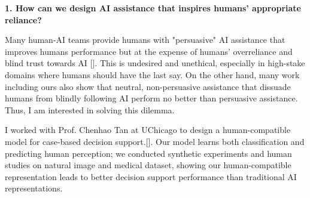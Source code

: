 
\noindent \textbf{1. How can we design AI assistance that inspires humans' appropriate reliance?}

Many human-AI teams provide humans with "persuasive" AI assistance that improves humans performance but at the expense of humans' overreliance and blind trust towards AI []. This is undesired and unethical, especially in high-stake domains where humans should have the last say.
On the other hand, many work including ours also show that neutral, non-persuasive assistance that dissuade humans from blindly following AI perform no better than persuasive assistance. Thus, I am interested in solving this dilemma.

I worked with Prof. Chenhao Tan at UChicago to design a human-compatible model for case-based decision support.[]. Our model learns both classification and predicting human perception; we conducted synthetic experiments and human studies on natural image and medical dataset, showing our human-compatible representation leads to better decision support performance than traditional AI representations.









